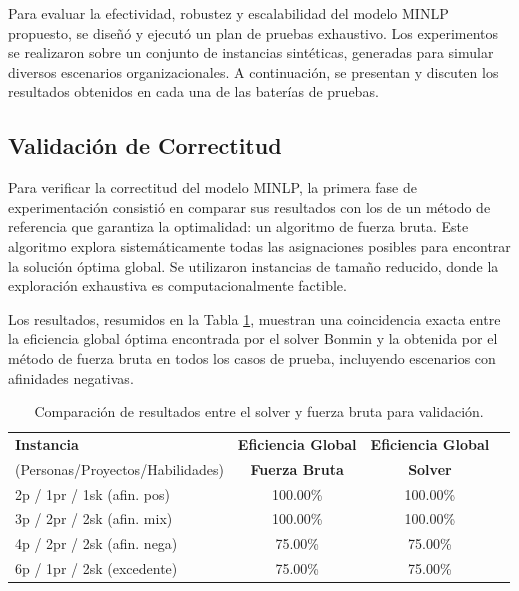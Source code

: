 \documentclass[conference]{IEEEtran}
\begin{document}
\par Para evaluar la efectividad, robustez y escalabilidad del modelo MINLP propuesto, se diseñó y ejecutó un plan de pruebas exhaustivo. Los experimentos se realizaron sobre un conjunto de instancias sintéticas, generadas para simular diversos escenarios organizacionales. A continuación, se presentan y discuten los resultados obtenidos en cada una de las baterías de pruebas.

\subsection{Validación de Correctitud}
Para verificar la correctitud del modelo MINLP, la primera fase de experimentación consistió en comparar sus resultados con los de un método de referencia que garantiza la optimalidad: un algoritmo de fuerza bruta. Este algoritmo explora sistemáticamente todas las asignaciones posibles para encontrar la solución óptima global. Se utilizaron instancias de tamaño reducido, donde la exploración exhaustiva es computacionalmente factible.

Los resultados, resumidos en la Tabla \ref{tab:correctitud}, muestran una coincidencia exacta entre la eficiencia global óptima encontrada por el solver Bonmin y la obtenida por el método de fuerza bruta en todos los casos de prueba, incluyendo escenarios con afinidades negativas.

\begin{table}[htbp]
    \centering
    \caption{Comparación de resultados entre el solver y fuerza bruta para validación.}
    \label{tab:correctitud}
    \begin{tabularx}{\linewidth}{@{}lccc@{}}
        \toprule
        \textbf{Instancia}               & \textbf{Eficiencia Global} & \textbf{Eficiencia Global} \\
        (Personas/Proyectos/Habilidades) & \textbf{Fuerza Bruta}      & \textbf{Solver}            \\
        \midrule
        2p / 1pr / 1sk (afin. pos)       & 100.00\%                   & 100.00\%                   \\
        3p / 2pr / 2sk (afin. mix)       & 100.00\%                   & 100.00\%                   \\
        4p / 2pr / 2sk (afin. nega)      & 75.00\%                    & 75.00\%                    \\
        6p / 1pr / 2sk (excedente)       & 75.00\%                    & 75.00\%                    \\
        \bottomrule
    \end{tabularx}
\end{table}
\end{document}
